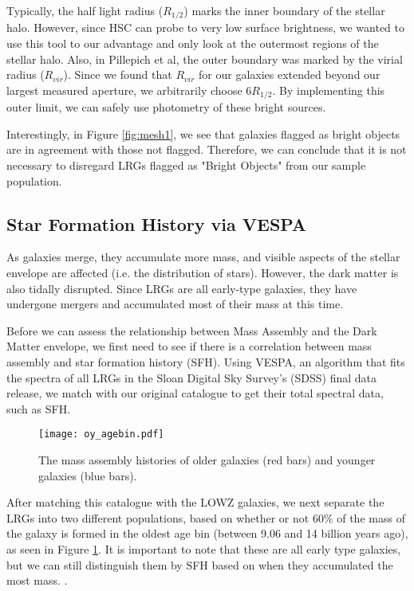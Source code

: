 \documentclass{article}
\begin{document}
Typically, the half light radius ($R_{1/2}$) marks the inner boundary of the stellar halo. However, since HSC can probe to very low surface brightness, we wanted to use this tool to our advantage and only look at the outermost regions of the stellar halo. Also, in Pillepich et al, the outer boundary was marked by the virial radius ($R_{vir}$). Since we found that $R_{vir}$ for our galaxies extended beyond our largest measured aperture, we arbitrarily choose $6R_{1/2}$.  By implementing this outer limit, we can safely use photometry of these bright sources.

Interestingly,  in Figure \ref{fig:mesh1}, we see that galaxies flagged as bright objects are in agreement with those not flagged. Therefore, we can conclude that it is not necessary to disregard LRGs flagged as "Bright Objects" from our sample population. 

\subsection{Star Formation History via VESPA}
As galaxies merge, they accumulate more mass, and visible aspects of the stellar envelope are affected (i.e. the distribution of stars). However, the dark matter is also tidally disrupted. Since LRGs are all early-type galaxies, they have undergone mergers and accumulated most of their mass at this time.

Before we can assess the relationship between Mass Assembly and the Dark Matter envelope, we first need to see if there is a correlation between mass assembly and star formation history (SFH). Using VESPA, an algorithm that fits the spectra of all LRGs in the Sloan Digital Sky Survey's (SDSS) final data release, we match with our original catalogue to get their total spectral data, such as SFH.

\begin{figure}[h!]
\centering
\texttt{[image: oy\_agebin.pdf]}
\caption{The mass assembly histories of older galaxies (red bars) and younger galaxies (blue bars).}
\label{fig:meshba}
\end{figure}

After matching this catalogue with the LOWZ galaxies, we next separate the LRGs into two different populations, based on whether or not 60\% of the mass of the galaxy is formed in the oldest age bin (between 9.06 and 14 billion years ago), as seen in Figure \ref{fig:meshba}. It is important to note that these are all early type galaxies, but we can still distinguish them by SFH based on when they accumulated the most mass. .
\end{document}
